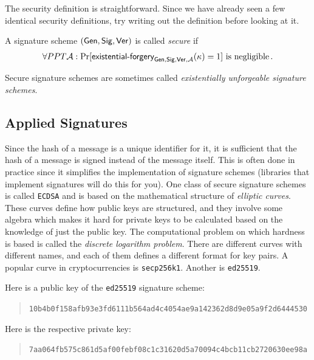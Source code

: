 The security definition is straightforward. Since we have already seen a few
identical security definitions, try writing out the definition before looking
at it.

\begin{definition}
  A signature scheme $(\mathsf{Gen}, \mathsf{Sig}, \mathsf{Ver})$ is called \emph{secure} if
  \begin{align*}
    \forall PPT \mathcal{A}:
    \Pr[\textsf{existential-forgery}_{\mathsf{Gen}, \mathsf{Sig}, \mathsf{Ver}, \mathcal{A}}(\kappa) = 1] \text{ is negligible}\,.
  \end{align*}
\end{definition}

Secure signature schemes are sometimes called \emph{existentially unforgeable signature
schemes}.

\subsection*{Applied Signatures}

Since the hash of a message is a unique identifier for it, it is sufficient that
the hash of a message is signed instead of the message itself. This is often done
in practice since it simplifies the implementation of signature schemes (libraries that implement
signatures will do this for you).
One class of secure signature schemes is called
\texttt{ECDSA} and is based on the mathematical structure of \emph{elliptic curves}.
These curves define how public keys are structured, and they involve some algebra
which makes it hard for private keys to be calculated based on the knowledge of
just the public key. The computational problem on which hardness is based is called
the \emph{discrete logarithm problem}.
There are different curves with different names, and each of them
defines a different format for key pairs.
A popular curve in cryptocurrencies is
\texttt{secp256k1}. Another is \texttt{ed25519}.

Here is a public key of the \texttt{ed25519} signature scheme:

\begin{quote}
\texttt{10b4b0f158afb93e3fd6111b564ad4c4054ae9a142362d8d9e05a9f2d6444530}
\end{quote}

Here is the respective private key:

\begin{quote}
\texttt{7aa064fb575c861d5af00febf08c1c31620d5a70094c4bcb11cb2720630ee98a}
\end{quote}

